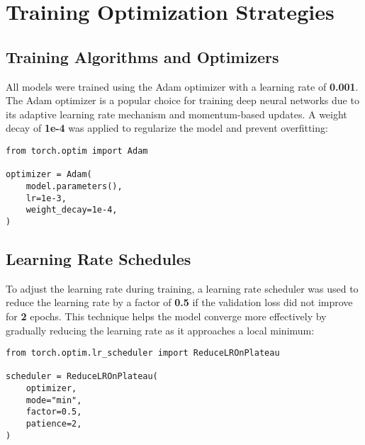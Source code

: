 \section{Training Optimization Strategies}

\subsection{Training Algorithms and Optimizers}\label{subsec:training-algorithms-optimizers}

All models were trained using the Adam optimizer \cite{kingma2017adammethodstochasticoptimization} with a learning rate of \textbf{0.001}. The Adam optimizer is a popular choice for training deep neural networks due to its adaptive learning rate mechanism and momentum-based updates. A weight decay of \textbf{1e-4} was applied to regularize the model and prevent overfitting:

\begin{minipage}{0.9\linewidth}\begin{lstlisting}[caption={Adam optimizer with weight decay.},label={lst:adam-optimizer}]
from torch.optim import Adam

optimizer = Adam(
    model.parameters(),
    lr=1e-3,
    weight_decay=1e-4,
)
\end{lstlisting}\end{minipage}

\subsection{Learning Rate Schedules}

To adjust the learning rate during training, a learning rate scheduler was used to reduce the learning rate by a factor of \textbf{0.5} if the validation loss did not improve for \textbf{2} epochs. This technique helps the model converge more effectively by gradually reducing the learning rate as it approaches a local minimum:

\begin{minipage}{0.9\linewidth}\begin{lstlisting}[caption={ReduceLROnPlateau learning rate scheduler.},label={lst:lr-scheduler}]
from torch.optim.lr_scheduler import ReduceLROnPlateau

scheduler = ReduceLROnPlateau(
    optimizer,
    mode="min",
    factor=0.5,
    patience=2,
)
\end{lstlisting}\end{minipage}

